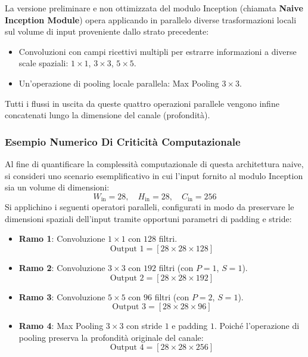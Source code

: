 ﻿\documentclass[11pt, a4paper]{article}
\begin{document}
La versione preliminare e non ottimizzata del modulo Inception (chiamata \textbf{Naive Inception Module}) opera applicando in parallelo diverse trasformazioni locali sul volume di input proveniente dallo strato precedente:


\begin{itemize}
    \item Convoluzioni con campi ricettivi multipli per estrarre informazioni a diverse scale spaziali: $1 \times 1$, $3 \times 3$, $5 \times 5$.
    \item Un'operazione di pooling locale parallela: Max Pooling $3 \times 3$.
\end{itemize}
Tutti i flussi in uscita da queste quattro operazioni parallele vengono infine concatenati lungo la dimensione del canale (profondità).

\subsubsection{Esempio Numerico Di Criticità Computazionale}

Al fine di quantificare la complessità computazionale di questa architettura naive, si consideri uno scenario esemplificativo in cui l'input fornito al modulo Inception sia un volume di dimensioni:
\[
W_{\text{in}} = 28, \quad H_{\text{in}} = 28, \quad C_{\text{in}} = 256
\]
Si applichino i seguenti operatori paralleli, configurati in modo da preservare le dimensioni spaziali dell'input tramite opportuni parametri di padding e stride:
\begin{itemize}
    \item \textbf{Ramo 1}: Convoluzione $1 \times 1$ con $128$ filtri.
    \[
    \text{Output 1} = [28 \times 28 \times 128]
    \]
    \item \textbf{Ramo 2}: Convoluzione $3 \times 3$ con $192$ filtri (con $P = 1$, $S = 1$).
    \[
    \text{Output 2} = [28 \times 28 \times 192]
    \]
    \item \textbf{Ramo 3}: Convoluzione $5 \times 5$ con $96$ filtri (con $P = 2$, $S = 1$).
    \[
    \text{Output 3} = [28 \times 28 \times 96]
    \]
    \item \textbf{Ramo 4}: Max Pooling $3 \times 3$ con stride $1$ e padding $1$. Poiché l'operazione di pooling preserva la profondità originale del canale:
    \[
    \text{Output 4} = [28 \times 28 \times 256]
    \]
\end{itemize}
\end{document}
